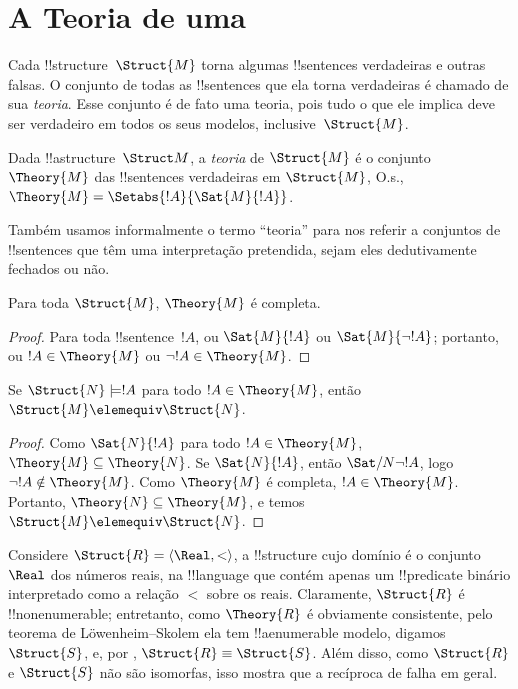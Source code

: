 \documentclass[../../../include/open-logic-section]{subfiles}
\begin{document}

\section{A Teoria de uma }

Cada !!{structure}~$\Struct{M}$ torna algumas !!{sentence}s verdadeiras e
outras falsas. O conjunto de todas as !!{sentence}s que ela torna verdadeiras é chamado
de sua \emph{teoria}. Esse conjunto é de fato uma teoria, pois tudo o que ele
implica deve ser verdadeiro em todos os seus modelos, inclusive~$\Struct{M}$.

\begin{defn}
  Dada !!a{structure}~$\Struct M$, a \emph{teoria} de
  $\Struct{M}$ é o conjunto $\Theory{M}$ das !!{sentence}s
  verdadeiras em $\Struct{M}$, O.s.\@, $\Theory{M} =
  \Setabs{!A}{\Sat{M}{!A}}$.
\end{defn}

Também usamos informalmente o termo ``teoria'' para nos referir a conjuntos
de !!{sentence}s que têm uma interpretação pretendida, sejam eles dedutivamente
fechados ou não.

\begin{prop}
Para toda $\Struct{M}$, $\Theory{M}$ é completa.
\end{prop}

\begin{proof}
Para toda !!{sentence}~$!A$, ou $\Sat{M}{!A}$ ou $\Sat{M}{\lnot !A}$;
portanto, ou $!A \in \Theory{M}$ ou $\lnot !A \in \Theory{M}$.
\end{proof}

\begin{prop}
  Se $\Struct{N} \models !A$ para todo $!A \in \Theory{M}$, então
  $\Struct{M} \elemequiv \Struct{N}$.
\end{prop}

\begin{proof}
Como $\Sat{N}{!A}$ para todo $!A \in \Theory{M}$, $\Theory{M} \subseteq
\Theory{N}$. Se $\Sat{N}{!A}$, então $\Sat/{N}{\lnot !A}$, logo $\lnot !A
\notin \Theory{M}$. Como $\Theory{M}$ é completa, $!A \in
\Theory{M}$. Portanto, $\Theory{N} \subseteq \Theory{M}$, e temos
$\Struct{M} \elemequiv \Struct{N}$.
\end{proof}

\begin{rem}
  Considere $\Struct{R} = \langle\Real, <\rangle$, a !!{structure}
  cujo domínio é o conjunto $\Real$ dos números reais, na !!{language}
  que contém apenas um !!{predicate} binário interpretado como a relação $<$
  sobre os reais. Claramente, $\Struct{R}$ é !!{nonenumerable};
  entretanto, como $\Theory{R}$ é obviamente consistente, pelo teorema de
  L\"owenheim--Skolem ela tem !!a{enumerable} modelo, digamos
  $\Struct{S}$, e, por , $\Struct{R}
  \equiv \Struct{S}$. Além disso, como $\Struct{R}$ e $\Struct{S}$
  não são isomorfas, isso mostra que a recíproca de
   falha em geral.
\end{rem}
\end{document}
